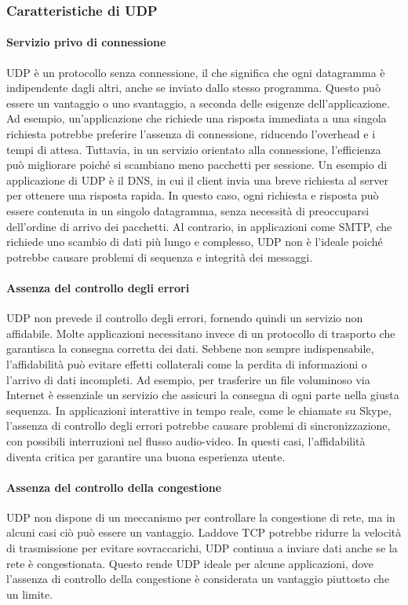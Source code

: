 \documentclass[12pt]{report}
\begin{document}
	\subsubsection{Caratteristiche di UDP}
	\paragraph{Servizio privo di connessione} UDP è un protocollo senza connessione, il che significa che ogni datagramma è indipendente dagli altri, anche se inviato dallo stesso programma. Questo può essere un vantaggio o uno svantaggio, a seconda delle esigenze dell'applicazione. Ad esempio, un’applicazione che richiede una risposta immediata a una singola richiesta potrebbe preferire l’assenza di connessione, riducendo l'overhead e i tempi di attesa. Tuttavia, in un servizio orientato alla connessione, l’efficienza può migliorare poiché si scambiano meno pacchetti per sessione. Un esempio di applicazione di UDP è il DNS, in cui il client invia una breve richiesta al server per ottenere una risposta rapida. In questo caso, ogni richiesta e risposta può essere contenuta in un singolo datagramma, senza necessità di preoccuparsi dell'ordine di arrivo dei pacchetti. Al contrario, in applicazioni come SMTP, che richiede uno scambio di dati più lungo e complesso, UDP non è l'ideale poiché potrebbe causare problemi di sequenza e integrità dei messaggi.

	\paragraph{Assenza del controllo degli errori} UDP non prevede il controllo degli errori, fornendo quindi un servizio non affidabile. Molte applicazioni necessitano invece di un protocollo di trasporto che garantisca la consegna corretta dei dati. Sebbene non sempre indispensabile, l’affidabilità può evitare effetti collaterali come la perdita di informazioni o l’arrivo di dati incompleti. Ad esempio, per trasferire un file voluminoso via Internet è essenziale un servizio che assicuri la consegna di ogni parte nella giusta sequenza. In applicazioni interattive in tempo reale, come le chiamate su Skype, l’assenza di controllo degli errori potrebbe causare problemi di sincronizzazione, con possibili interruzioni nel flusso audio-video. In questi casi, l'affidabilità diventa critica per garantire una buona esperienza utente.

	\paragraph{Assenza del controllo della congestione} UDP non dispone di un meccanismo per controllare la congestione di rete, ma in alcuni casi ciò può essere un vantaggio. Laddove TCP potrebbe ridurre la velocità di trasmissione per evitare sovraccarichi, UDP continua a inviare dati anche se la rete è congestionata. Questo rende UDP ideale per alcune applicazioni, dove l'assenza di controllo della congestione è considerata un vantaggio piuttosto che un limite.
\end{document}
